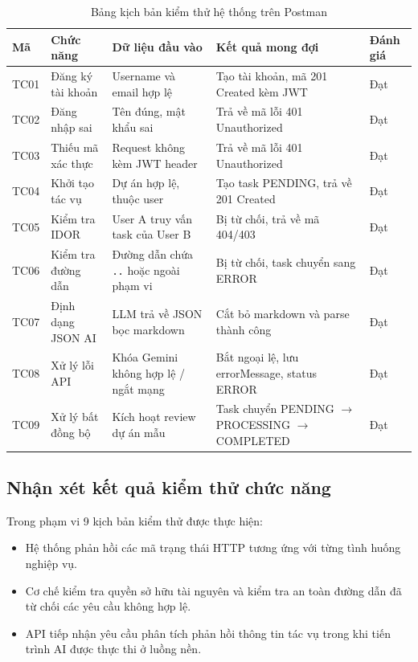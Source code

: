 \documentclass[12pt,a4paper]{report}
\begin{document}
\begin{table}[H]
\centering
\caption{Bảng kịch bản kiểm thử hệ thống trên Postman}
\label{tab:test_cases}
\renewcommand{\arraystretch}{1.2}
\begin{tabular}{|p{1.0cm}|p{3.2cm}|p{3.6cm}|p{3.8cm}|p{2.2cm}|}
\hline
\textbf{Mã} & \textbf{Chức năng} & \textbf{Dữ liệu đầu vào} & \textbf{Kết quả mong đợi} & \textbf{Đánh giá} \\ \hline
TC01 & Đăng ký tài khoản & Username và email hợp lệ & Tạo tài khoản, mã 201 Created kèm JWT & Đạt \\ \hline
TC02 & Đăng nhập sai & Tên đúng, mật khẩu sai & Trả về mã lỗi 401 Unauthorized & Đạt \\ \hline
TC03 & Thiếu mã xác thực & Request không kèm JWT header & Trả về mã lỗi 401 Unauthorized & Đạt \\ \hline
TC04 & Khởi tạo tác vụ & Dự án hợp lệ, thuộc user & Tạo task PENDING, trả về 201 Created & Đạt \\ \hline
TC05 & Kiểm tra IDOR & User A truy vấn task của User B & Bị từ chối, trả về mã 404/403 & Đạt \\ \hline
TC06 & Kiểm tra đường dẫn & Đường dẫn chứa \texttt{..} hoặc ngoài phạm vi & Bị từ chối, task chuyển sang ERROR & Đạt \\ \hline
TC07 & Định dạng JSON AI & LLM trả về JSON bọc markdown & Cắt bỏ markdown và parse thành công & Đạt \\ \hline
TC08 & Xử lý lỗi API & Khóa Gemini không hợp lệ / ngắt mạng & Bắt ngoại lệ, lưu errorMessage, status ERROR & Đạt \\ \hline
TC09 & Xử lý bất đồng bộ & Kích hoạt review dự án mẫu & Task chuyển PENDING $\rightarrow$ PROCESSING $\rightarrow$ COMPLETED & Đạt \\ \hline
\end{tabular}
\end{table}

\subsection{Nhận xét kết quả kiểm thử chức năng}
Trong phạm vi 9 kịch bản kiểm thử được thực hiện:
\begin{itemize}
    \item Hệ thống phản hồi các mã trạng thái HTTP tương ứng với từng tình huống nghiệp vụ.
    \item Cơ chế kiểm tra quyền sở hữu tài nguyên và kiểm tra an toàn đường dẫn đã từ chối các yêu cầu không hợp lệ.
    \item API tiếp nhận yêu cầu phân tích phản hồi thông tin tác vụ trong khi tiến trình AI được thực thi ở luồng nền.
\end{itemize}
\end{document}
